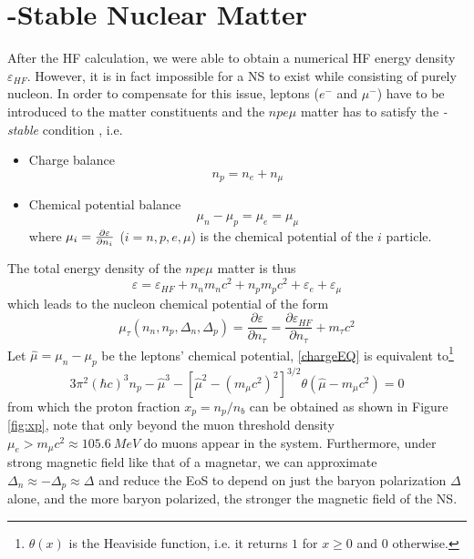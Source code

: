 \section{\textbeta-Stable Nuclear Matter}%
\label{sec:textbeta_stable_nuclear_matter}

After the \gls{HF} calculation, we were able to obtain a numerical \gls{HF} energy density $\varepsilon_{HF}$. However, it is in fact impossible for a \gls{NS} to exist while consisting of purely nucleon. In order to compensate for this issue, leptons ($e^-$ and $\mu^-$) have to be introduced to the matter constituents and the $npe\mu$ matter has to satisfy the \emph{\textbeta-stable} condition \citep{glendenning2012compact}, i.e.
\begin{itemize}
        \item Charge balance
                \begin{equation}
                        n_p = n_e + n_\mu
                        \label{chargeEQ}
                \end{equation}
        \item Chemical potential balance
                \begin{equation}
                        \mu_n - \mu_p = \mu_e = \mu_\mu
                \end{equation}
                where $\mu_i = \pdv{\varepsilon}{n_i}$ ($i=n,p,e,\mu$) is the chemical potential of the $i$ particle.
\end{itemize}
The total energy density of the $npe\mu$ matter is thus
\begin{equation}
        \varepsilon = \varepsilon_{HF} + n_n m_n c^2 + n_p m_p c^2 + \varepsilon_e + \varepsilon_\mu 
\end{equation}
which leads to the nucleon chemical potential of the form
\begin{equation}
        \mu_\tau (n_n,n_p,\Delta_n,\Delta_p) = \frac{\partial \varepsilon}{\partial n_\tau}  = \frac{\partial \varepsilon_{HF}}{\partial n_\tau} + m_\tau c^2
\end{equation}
Let $\hat{\mu} = \mu_n - \mu_p$ be the leptons' chemical potential, \eqref{chargeEQ} is equivalent to\footnote{$\theta(x)$ is the Heaviside function, i.e. it returns $1$ for $x\geq 0$ and $0$ otherwise.}
\begin{equation}
        3\pi^2 (\hbar c)^3 n_p - \hat{\mu}^3 - \left[ \hat{\mu}^2 - (m_\mu c^2)^2 \right]^{3/2} \theta(\hat{\mu} - m_\mu c^2) = 0
\end{equation}
from which the proton fraction $x_p = n_p/n_b$ can be obtained as shown in Figure \ref{fig:xp}, note that only beyond the muon threshold density $\mu_e > m_\mu c^2 \approx 105.6\:MeV$ do muons appear in the system. Furthermore, under strong magnetic field like that of a magnetar, we can approximate $\Delta_n \approx -\Delta_p \approx \Delta$ and reduce the \gls{EoS} to depend on just the baryon polarization $\Delta$ alone, and the more baryon polarized, the stronger the magnetic field of the \gls{NS}.\par
